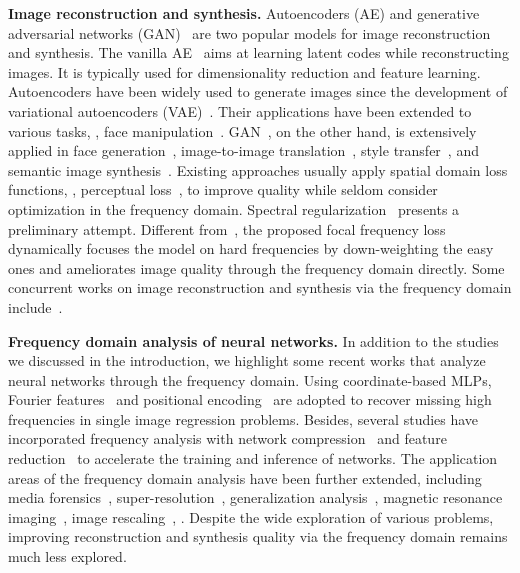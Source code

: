\documentclass[10pt,twocolumn,letterpaper]{article}
\begin{document}
\noindent
\textbf{Image reconstruction and synthesis.}
Autoencoders (AE) \cite{ae,vae} and generative adversarial networks (GAN)~\cite{GAN} are two popular models for image reconstruction and synthesis.
The vanilla AE~\cite{ae} aims at learning latent codes while reconstructing images. It is typically used for dimensionality reduction and feature learning. 
Autoencoders have been widely used to generate images since the development of variational autoencoders (VAE)~\cite{vae,convae}. Their applications have been extended to various tasks, \eg, face manipulation~\cite{DeepFakes,DFL,deeperforensics1,dfc20}.
GAN~\cite{GAN,congan,DCGAN}, on the other hand, is extensively applied in face generation~\cite{pggan,stylegan,stylegan2}, image-to-image translation~\cite{pix2pix,cyclegan,stargan,tsit}, style transfer~\cite{UNIT,MUNIT}, and semantic image synthesis~\cite{pix2pixhd,SPADE,CC-FPSE}.
Existing approaches usually apply spatial domain loss functions, \eg, perceptual loss~\cite{perceptualloss}, to improve quality while seldom consider optimization in the frequency domain.
Spectral regularization~\cite{specreg} presents a preliminary attempt.
Different from~\cite{perceptualloss,specreg}, the proposed focal frequency loss dynamically focuses the model on hard frequencies by down-weighting the easy ones and ameliorates image quality through the frequency domain directly.
Some concurrent works on image reconstruction and synthesis via the frequency domain include~\cite{fdit,swagan,specgan}.


\noindent
\textbf{Frequency domain analysis of neural networks.}
In addition to the studies~\cite{spectralbias,nerf,fourierfeatures,fprinciple} we discussed in the introduction, we highlight some recent works that analyze neural networks through the frequency domain.
Using coordinate-based MLPs, Fourier features~\cite{fourierfeatures,randomfeatures} and positional encoding~\cite{nerf,attention} are adopted to recover missing high frequencies in single image regression problems.
Besides, several studies have incorporated frequency analysis with network compression~\cite{fasternetjpeg,learninfreq,stylewavelet,compressfreq,notsobiggan} and feature reduction~\cite{featreduction,cnnpack} to accelerate the training and inference of networks.
The application areas of the frequency domain analysis have been further extended, including media forensics~\cite{cnndetection,artifactsganfake,fakeretouch,freqdeepfakeicml}, super-resolution~\cite{freqsepsr,dmawaresr}, generalization analysis~\cite{generalizefreq,rda}, magnetic resonance imaging~\cite{jointfreq}, image rescaling~\cite{invertrescale}, \etc.
Despite the wide exploration of various problems, improving reconstruction and synthesis quality via the frequency domain remains much less explored.
\end{document}
